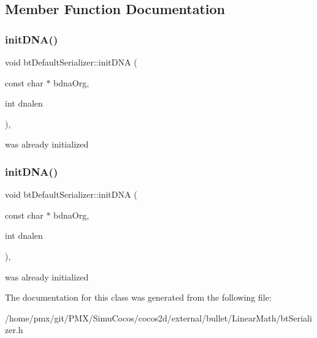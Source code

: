 \subsection{Member Function Documentation}
\mbox{\label{classbtDefaultSerializer_a086b9ce0a49cb08de90528644bfe9d83}} 
\subsubsection{\texorpdfstring{init\+D\+N\+A()}{initDNA()}\hspace{0.1cm}{\footnotesize\ttfamily [1/2]}}
{\footnotesize\ttfamily void bt\+Default\+Serializer\+::init\+D\+NA (\begin{DoxyParamCaption}\item[{const char $\ast$}]{bdna\+Org,  }\item[{int}]{dnalen }\end{DoxyParamCaption})\hspace{0.3cm}{\ttfamily [inline]}, {\ttfamily [protected]}}

was already initialized \mbox{\label{classbtDefaultSerializer_a086b9ce0a49cb08de90528644bfe9d83}} 
\subsubsection{\texorpdfstring{init\+D\+N\+A()}{initDNA()}\hspace{0.1cm}{\footnotesize\ttfamily [2/2]}}
{\footnotesize\ttfamily void bt\+Default\+Serializer\+::init\+D\+NA (\begin{DoxyParamCaption}\item[{const char $\ast$}]{bdna\+Org,  }\item[{int}]{dnalen }\end{DoxyParamCaption})\hspace{0.3cm}{\ttfamily [inline]}, {\ttfamily [protected]}}

was already initialized 

The documentation for this class was generated from the following file\+:\begin{DoxyCompactItemize}
\item 
/home/pmx/git/\+P\+M\+X/\+Simu\+Cocos/cocos2d/external/bullet/\+Linear\+Math/bt\+Serializer.\+h\end{DoxyCompactItemize}
